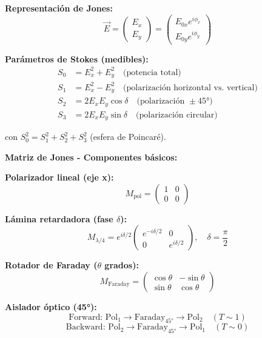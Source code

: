 \documentclass[11pt,a4paper]{article}
\begin{document}
\textbf{Representación de Jones:}
\begin{equation}
    \vec{E} = \begin{pmatrix} E_x \\ E_y \end{pmatrix} = \begin{pmatrix} E_{0x}e^{i\phi_x} \\ E_{0y}e^{i\phi_y} \end{pmatrix}
\end{equation}

\textbf{Parámetros de Stokes (medibles):}
\begin{align}
    S_0 &= E_x^2 + E_y^2 \quad \text{(potencia total)} \\
    S_1 &= E_x^2 - E_y^2 \quad \text{(polarización horizontal vs. vertical)} \\
    S_2 &= 2E_xE_y\cos\delta \quad \text{(polarización }±45°\text{)} \\
    S_3 &= 2E_xE_y\sin\delta \quad \text{(polarización circular)}
\end{align}

con $S_0^2 = S_1^2 + S_2^2 + S_3^2$ (esfera de Poincaré).

\textbf{Matriz de Jones - Componentes básicos:}

\textbf{Polarizador lineal (eje x):}
\begin{equation}
    M_{\text{pol}} = \begin{pmatrix} 1 & 0 \\ 0 & 0 \end{pmatrix}
\end{equation}

\textbf{Lámina retardadora (fase $\delta$):}
\begin{equation}
    M_{\lambda/4} = e^{i\delta/2}\begin{pmatrix} e^{-i\delta/2} & 0 \\ 0 & e^{i\delta/2} \end{pmatrix}, \quad \delta = \frac{\pi}{2}
\end{equation}

\textbf{Rotador de Faraday ($\theta$ grados):}
\begin{equation}
    M_{\text{Faraday}} = \begin{pmatrix} \cos\theta & -\sin\theta \\ \sin\theta & \cos\theta \end{pmatrix}
\end{equation}

\textbf{Aislador óptico (45°):}
\begin{equation}
    \text{Forward: } \text{Pol}_1 \rightarrow \text{Faraday}_{45°} \rightarrow \text{Pol}_2 \quad (T \sim 1)
\end{equation}
\begin{equation}
    \text{Backward: } \text{Pol}_2 \rightarrow \text{Faraday}_{45°} \rightarrow \text{Pol}_1 \quad (T \sim 0)
\end{equation}
\end{document}
